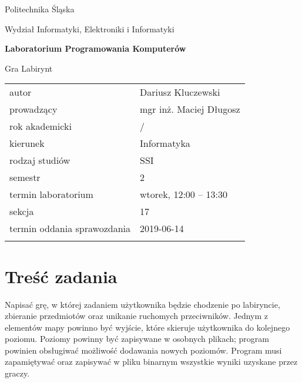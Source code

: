 \documentclass[12pt,a4paper,twoside]{article}
\newcounter{rok}
\newcommand{\rokakademicki}{%
   \setcounter{rok}{\number\year}%
   \ifthenelse{\number\month<10}%
   {\addtocounter{rok}{-1}}%
   {}%
   \arabic{rok}/\addtocounter{rok}{1}\arabic{rok}
}
\begin{document}
\frenchspacing
\thispagestyle{empty}
\begin{center}
{\Large\sf Politechnika Śląska   %

Wydział Informatyki, Elektroniki i Informatyki

}

\vfill

 

\vfill\vfill

{\Huge\sffamily\bfseries Laboratorium Programowania Komputerów\par}  

\vfill\vfill

{\LARGE\sf Gra Labirynt}   


\vfill \vfill\vfill\vfill






\begin{tabular}{ll}
	\toprule
	autor                       & Dariusz Kluczewski     \\
	prowadzący                  & mgr inż. Maciej Długosz  \\
	rok akademicki              & \rokakademicki         \\
	kierunek                    & Informatyka            \\
	rodzaj studiów              & SSI                    \\
	semestr                     & 2                      \\
	termin laboratorium         & wtorek, 12:00 -- 13:30 \\
	sekcja                      & 17                     \\
	termin oddania sprawozdania & 2019-06-14             \\
	\bottomrule
	                            &
\end{tabular}

\end{center}

\cleardoublepage

\section{Treść zadania}
Napisać grę, w której zadaniem użytkownika będzie chodzenie po labiryncie, zbieranie przedmiotów oraz unikanie ruchomych
przeciwników. Jednym z elementów mapy powinno być wyjście, które skieruje użytkownika do kolejnego poziomu. Poziomy
powinny być zapisywane w osobnych plikach; program powinien obsługiwać możliwość dodawania nowych poziomów. Program
musi zapamiętywać oraz zapisywać w pliku binarnym wszystkie wyniki uzyskane przez graczy.
\end{document}
